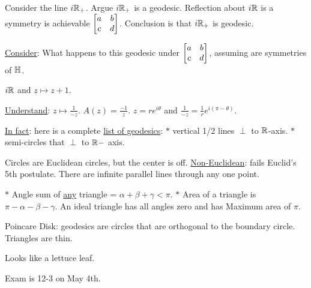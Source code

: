 \documentclass[]{article}
\begin{document}
Consider the line $i\mathbb{R}_+$. Argue $i\mathbb{R}_+$ is a geodesic. Reflection about $i\mathbb{R}$ is a symmetry is achievable $\begin{bmatrix}a&b\\c&d\end{bmatrix}$. Conclusion is that $i\mathbb{R}_+$ is geodesic.

\ul{Consider}: What happens to this geodesic under $\begin{bmatrix}a&b \\ c&d\end{bmatrix}$, assuming are symmetries of $\mathbb{H}$.

\begin{example}
	$i\mathbb{R}$ and $z\mapsto z+1$.
\end{example}

\begin{example}
	\ul{Understand}: $z\mapsto \frac{1}{-z}$. $A(z) = \frac{-1}{z}$. $z = re^{i\theta}$ and $\frac{1}{-z} = \frac{1}{r} e^{i(\pi-\theta)}$.
\end{example}
\ul{In fact}: here is a complete \ul{list of geodesics}: $*$ vertical 1/2 lines $\perp$ to $\mathbb{R}$-axis. $*$ semi-circles that $\perp$ to $\mathbb{R}-$ axis.

\begin{fact}
	Circles are Euclidean circles, but the center is off. \ul{Non-Euclidean}: fails Euclid's 5th postulate. There are infinite parallel lines through any one point.
\end{fact}

$*$ Angle sum of \ul{any} triangle = $\alpha + \beta + \gamma < \pi$. 
$*$ Area of a triangle is $\pi-\alpha-\beta-\gamma$. An ideal triangle has all angles zero and has Maximum area of $\pi$.


Poincare Disk: geodesics are circles that are orthogonal to the boundary circle. Triangles are thin.

Looks like a lettuce leaf.

Exam is 12-3 on May 4th.
\end{document}
